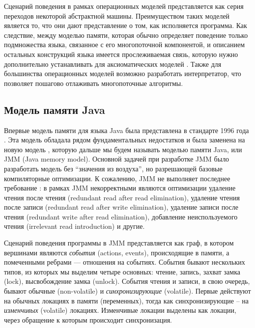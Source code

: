 Сценарий поведения в рамках операционных моделей представляется как
серия переходов некоторой абстрактной машины.
Преимуществом таких моделей является то, что они дают представление о том, как исполняется программа.
Как следствие, между моделью памяти, которая обычно определяет поведение только подмножества языка, связанное с его многопоточной
компонентой, и описанием остальных конструкций языка имеется прослеживаемая связь, которую нужно дополнительно
устанавливать для аксиоматических моделей \cite{Memarian-al:PLDI16}.
Также для большинства операционных моделей возможно разработать интерпретатор, что позволяет пошагово
отлаживать многопоточные алгоритмы.


\subsection{Модель памяти Java}
Впервые модель памяти для языка Java была представлена в стандарте 1996 года \cite{Gosling-al:BOOK96}.
Эта модель обладала рядом фундаментальных недостатков \cite{Pugh:JAVA99,Pugh:CPE00} и была заменена на
новую модель \cite{Manson-al:POPL05}, которую дальше мы будем называть моделью памяти Java, или JMM (Java memory model).
Основной задачей при разработке JMM было разработать модель без ``значения из воздуха'',
но разрешающей базовые компиляторные оптимизации.
К сожалению, JMM не выполняет последнее требование \cite{Sevcik-Aspinall:ECOOP08}:
в рамках JMM некорректными являются оптимизации удаление чтения после чтения (redundant read after read elimination),
удаление чтения после записи (redundant read after write elimination),
удаление записи после чтения (redundant write after read elimination),
добавление неиспользуемого чтения (irrelevant read introduction) и другие.

Сценарий поведения программы в JMM представляется как граф, в котором вершинами
являются \emph{события} (actions, events), происходящие в памяти, а помеченными ребрами ---
отношения на событиях.
События бывают нескольких типов, из которых мы выделим четыре основных:
чтение, запись, захват замка (lock), высвобождение замка (unlock).
События чтения и записи, в свою очередь, бывают обычные (non-volatile) и \emph{синхронизирующие} (volatile).
Первые действуют на обычных локациях в памяти (переменных), тогда как синхронизирующие -- на
\emph{изменчивых} (volatile) локациях.
Изменчивые локации выделены как локации, через обращение к которым происходит синхронизация.

